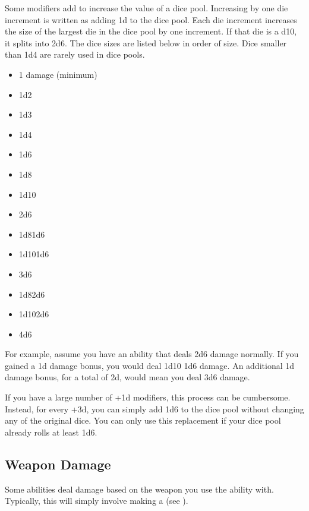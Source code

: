             Some modifiers add  to increase the value of a dice pool.
            Increasing by one die increment is written as adding \plus1d to the dice pool.
            Each die increment increases the size of the largest die in the dice pool by one increment.
            If that die is a d10, it splits into 2d6.
            The dice sizes are listed below in order of size.
            Dice smaller than 1d4 are rarely used in dice pools.
            \begin{itemize}
                \item 1 damage (minimum)
                \item 1d2
                \item 1d3
                \item 1d4
                \item 1d6
                \item 1d8
                \item 1d10
                \item 2d6
                \item 1d8\plus1d6
                \item 1d10\plus1d6
                \item 3d6
                \item 1d8\plus2d6
                \item 1d10\plus2d6
                \item 4d6
            \end{itemize}

            For example, assume you have an ability that deals 2d6 damage normally.
            If you gained a \plus1d damage bonus, you would deal 1d10 \add 1d6 damage.
            An additional \plus1d damage bonus, for a total of \plus2d, would mean you deal 3d6 damage.

            If you have a large number of +1d modifiers, this process can be cumbersome.
            Instead, for every +3d, you can simply add 1d6 to the dice pool without changing any of the original dice.
            You can only use this replacement if your dice pool already rolls at least 1d6.

    \subsection{Weapon Damage}\label{Weapon Damage}
        Some abilities deal damage based on the weapon you use the ability with.
        Typically, this will simply involve making a  (see ).

